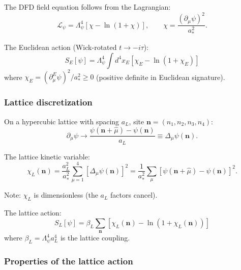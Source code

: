 \documentclass[11pt,a4paper]{article}
\begin{document}
The DFD field equation follows from the Lagrangian:
\begin{equation}
\mathcal{L}_\psi = \Lambda_\psi^4\left[\chi - \ln(1+\chi)\right], \qquad \chi = \frac{(\partial_\mu\psi)^2}{a_*^2}.
\end{equation}

The Euclidean action (Wick-rotated $t \to -i\tau$):
\begin{equation}
S_E[\psi] = \Lambda_\psi^4\int d^4x_E\left[\chi_E - \ln(1+\chi_E)\right]
\end{equation}
where $\chi_E = (\partial_\mu^E\psi)^2/a_*^2 \geq 0$ (positive definite in Euclidean signature).

\subsubsection{Lattice discretization}

On a hypercubic lattice with spacing $a_L$, site $\mathbf{n} = (n_1,n_2,n_3,n_4)$:
\begin{equation}
\partial_\mu\psi \to \frac{\psi(\mathbf{n}+\hat\mu) - \psi(\mathbf{n})}{a_L} \equiv \Delta_\mu\psi(\mathbf{n}).
\end{equation}

The lattice kinetic variable:
\begin{equation}
\chi_L(\mathbf{n}) = \frac{a_L^2}{a_*^2}\sum_{\mu=1}^4 \left[\Delta_\mu\psi(\mathbf{n})\right]^2 = \frac{1}{a_*^2}\sum_\mu\left[\psi(\mathbf{n}+\hat\mu) - \psi(\mathbf{n})\right]^2.
\end{equation}

Note: $\chi_L$ is dimensionless (the $a_L$ factors cancel).

The lattice action:
\begin{equation}\label{eq:lattice-action}
\boxed{S_L[\psi] = \beta_L\sum_{\mathbf{n}}\left[\chi_L(\mathbf{n}) - \ln\left(1 + \chi_L(\mathbf{n})\right)\right]}
\end{equation}
where $\beta_L = \Lambda_\psi^4 a_L^4$ is the lattice coupling.

\subsubsection{Properties of the lattice action}
\end{document}
